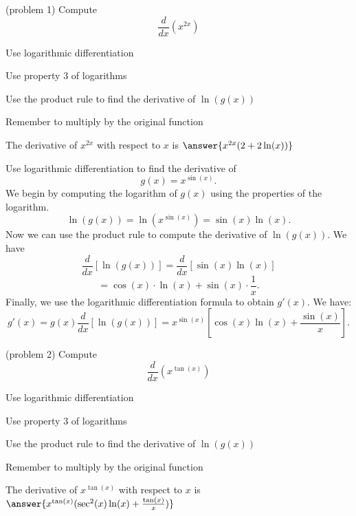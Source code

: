 \documentclass[handout]{ximera}
\begin{document}
\begin{problem}(problem 1)
  Compute
  \[
  \frac{d}{dx} \left(x^{2x}\right)
  \]
  
    \begin{hint}
      Use logarithmic differentiation
    \end{hint}
    \begin{hint}
      Use property 3 of logarithms
    \end{hint}
    \begin{hint}
		  Use the product rule to find the derivative of $\ln(g(x))$
		\end{hint}
		\begin{hint}
		  Remember to multiply by the original function
		\end{hint}
    
		The derivative of $x^{2x}$ with respect to $x$ is
		 $\answer{x^{2x} (2+2\ln(x))}$
		
\end{problem}

\begin{example}[example 2]
Use logarithmic differentiation to find the derivative of 
\[
g(x) = x^{\sin(x)}.
\]
We begin by computing the logarithm of $g(x)$ using the properties of the logarithm.
\[
\ln(g(x)) = \ln\left(x^{\sin(x)}\right) = \sin(x)\ln(x).
\]
Now we can use the product rule to compute the derivative of $\ln(g(x))$.
We have
\[
\frac{d}{dx} \left[\ln(g(x))\right] = \frac{d}{dx} \left[\sin(x)\ln(x)\right]
\]
\[
= \cos(x)\cdot \ln(x) + \sin(x) \cdot \frac{1}{x}.
\]
Finally, we use the logarithmic differentiation formula to obtain $g'(x)$.
We have:
\[
g'(x) = g(x) \frac{d}{dx} \left[\ln(g(x))\right] = x^{\sin(x)} \left[\cos(x)\ln(x) + \frac{\sin(x)}{x}\right].
\]

\end{example}


\begin{problem}(problem 2)
  Compute
  \[
  \frac{d}{dx} \left(x^{\tan(x)}\right)
  \]
  
    \begin{hint}
      Use logarithmic differentiation
    \end{hint}
    \begin{hint}
      Use property 3 of logarithms
    \end{hint}
    \begin{hint}
		  Use the product rule to find the derivative of $\ln(g(x))$
		\end{hint}
		\begin{hint}
		  Remember to multiply by the original function
		\end{hint}
    
		The derivative of $x^{\tan(x)}$ with respect to $x$ is
		 $\answer{x^{\tan(x)} (\sec^2(x)\ln(x) + \frac{\tan(x)}{x})}$
		
\end{problem}
\end{document}
